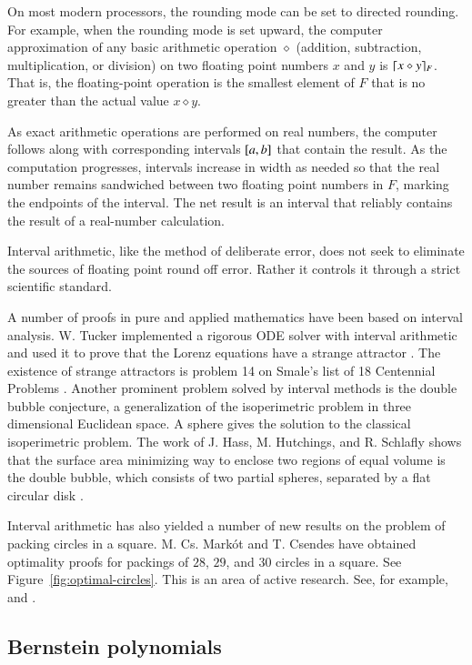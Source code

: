 On most modern processors, the rounding mode can be set to directed
rounding.  For example, when the rounding mode is set upward, the
computer approximation of any basic arithmetic operation $\diamond$
(addition, subtraction, multiplication, or division) on two floating
point numbers $x$ and $y$ is $\lceil x\diamond y\rceil_F$.  That is, the
floating-point operation is the smallest element of $F$ that is no
greater than the actual value $x\diamond y$.

As exact arithmetic operations are performed on real numbers, the
computer follows along with corresponding intervals $[
a,b]$ that contain the result.  As the computation
progresses, intervals increase in width as needed so that the real
number remains sandwiched between two floating point numbers in $F$, marking
the endpoints of the interval.
The net result is an interval that reliably contains the result of a
real-number calculation.

Interval arithmetic, like the method of deliberate error, does not
seek to eliminate the sources of floating point round off error.
Rather it controls it through a strict scientific standard.


A number of proofs in pure and applied mathematics have been based on
interval analysis.  W. Tucker implemented a rigorous ODE solver with
interval arithmetic and used it to prove that the Lorenz equations
have a strange attractor \cite{Tuc02}. The existence of strange
attractors is problem 14 on Smale's list of 18 Centennial Problems
\cite{Sma98}.  Another prominent problem solved by interval methods is
the double bubble conjecture, a generalization of the isoperimetric
problem in three dimensional Euclidean space.  A sphere gives the
solution to the classical isoperimetric problem.  The work of J. Hass,
M. Hutchings, and R. Schlafly shows that the surface area minimizing
way to enclose two regions of equal volume is the double bubble, which
consists of two partial spheres, separated by a flat circular disk
\cite{HHS95}.

Interval arithmetic has also yielded a number of new results on the
problem of packing circles in a square. M. Cs. Mark\'ot and T. Csendes
have obtained optimality proofs for packings of $28$, $29$, and $30$
circles in a square.  See Figure~\ref{fig:optimal-circles}.  This is
an area of active research. See, for example, \cite{Sza07} and
\cite{Mark07}.


\subsection{Bernstein polynomials}

